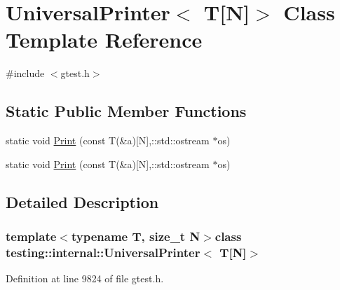 \hypertarget{classtesting_1_1internal_1_1UniversalPrinter_3_01T[N]_4}{\section{\-Universal\-Printer$<$ \-T\mbox{[}\-N\mbox{]}$>$ \-Class \-Template \-Reference}
\label{da/db6/classtesting_1_1internal_1_1UniversalPrinter_3_01T[N]_4}
}


{\ttfamily \#include $<$gtest.\-h$>$}

\subsection*{\-Static \-Public \-Member \-Functions}
\begin{DoxyCompactItemize}
\item 
static void \hyperlink{classtesting_1_1internal_1_1UniversalPrinter_3_01T[N]_4_a0337bca2bacfe674313cdc7a1f44f0d4}{\-Print} (const \-T(\&a)\mbox{[}\-N\mbox{]},\-::std\-::ostream $\ast$os)
\item 
static void \hyperlink{classtesting_1_1internal_1_1UniversalPrinter_3_01T[N]_4_a0337bca2bacfe674313cdc7a1f44f0d4}{\-Print} (const \-T(\&a)\mbox{[}\-N\mbox{]},\-::std\-::ostream $\ast$os)
\end{DoxyCompactItemize}


\subsection{\-Detailed \-Description}
\subsubsection*{template$<$typename T, size\-\_\-t \-N$>$class testing\-::internal\-::\-Universal\-Printer$<$ T\mbox{[}\-N\mbox{]}$>$}



\-Definition at line 9824 of file gtest.\-h.



